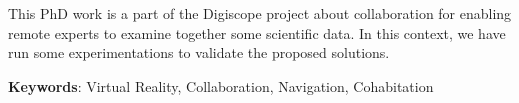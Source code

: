 This PhD work is a part of the Digiscope project about collaboration for enabling remote experts to examine together some scientific data. In this context, we have run some experimentations to validate the proposed solutions.

\textbf{Keywords}: Virtual Reality, Collaboration, Navigation, Cohabitation

\pagebreak
